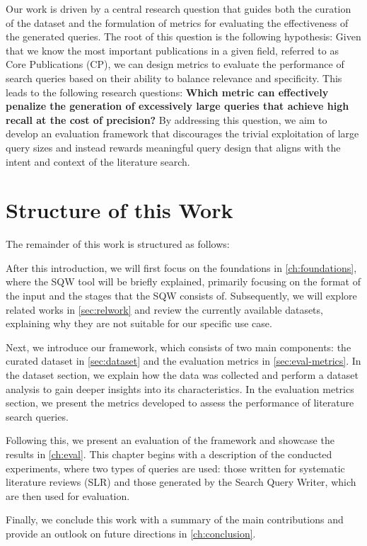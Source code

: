 Our work is driven by a central research question that guides both the curation of the dataset and the formulation of metrics for evaluating the effectiveness of the generated queries. The root of this question is the following hypothesis: Given that we know the most important publications in a given field, referred to as Core Publications (CP), we can design metrics to evaluate the performance of search queries based on their ability to balance relevance and specificity. This leads to the following research questions: \textbf{Which metric can effectively penalize the generation of excessively large queries that achieve high recall at the cost of precision?} By addressing this question, we aim to develop an evaluation framework that discourages the trivial exploitation of large query sizes and instead rewards meaningful query design that aligns with the intent and context of the literature search.


\section{Structure of this Work}\label{sec:structure}
The remainder of this work is structured as follows:

After this introduction, we will first focus on the foundations in \autoref{ch:foundations}, where the SQW tool will be briefly explained, primarily focusing on the format of the input and the stages that the SQW consists of. Subsequently, we will explore related works in \autoref{sec:relwork} and review the currently available datasets, explaining why they are not suitable for our specific use case.

Next, we introduce our framework, which consists of two main components: the curated dataset in \autoref{sec:dataset} and the evaluation metrics in \autoref{sec:eval-metrics}. In the dataset section, we explain how the data was collected and perform a dataset analysis to gain deeper insights into its characteristics. In the evaluation metrics section, we present the metrics developed to assess the performance of literature search queries.

Following this, we present an evaluation of the framework and showcase the results in \autoref{ch:eval}. This chapter begins with a description of the conducted experiments, where two types of queries are used: those written for systematic literature reviews (SLR) and those generated by the Search Query Writer, which are then used for evaluation.

Finally, we conclude this work with a summary of the main contributions and provide an outlook on future directions in \autoref{ch:conclusion}.

